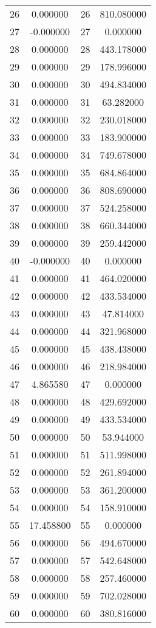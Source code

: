\documentclass[12pt]{article}
\begin{document}
\begin{longtable}{@{}cccc@{}}
26 & 0.000000 & 26 & 810.080000 \\
27 & -0.000000 & 27 & 0.000000 \\
28 & 0.000000 & 28 & 443.178000 \\
29 & 0.000000 & 29 & 178.996000 \\
30 & 0.000000 & 30 & 494.834000 \\
31 & 0.000000 & 31 & 63.282000 \\
32 & 0.000000 & 32 & 230.018000 \\
33 & 0.000000 & 33 & 183.900000 \\
34 & 0.000000 & 34 & 749.678000 \\
35 & 0.000000 & 35 & 684.864000 \\
36 & 0.000000 & 36 & 808.690000 \\
37 & 0.000000 & 37 & 524.258000 \\
38 & 0.000000 & 38 & 660.344000 \\
39 & 0.000000 & 39 & 259.442000 \\
40 & -0.000000 & 40 & 0.000000 \\
41 & 0.000000 & 41 & 464.020000 \\
42 & 0.000000 & 42 & 433.534000 \\
43 & 0.000000 & 43 & 47.814000 \\
44 & 0.000000 & 44 & 321.968000 \\
45 & 0.000000 & 45 & 438.438000 \\
46 & 0.000000 & 46 & 218.984000 \\
47 & 4.865580 & 47 & 0.000000 \\
48 & 0.000000 & 48 & 429.692000 \\
49 & 0.000000 & 49 & 433.534000 \\
50 & 0.000000 & 50 & 53.944000 \\
51 & 0.000000 & 51 & 511.998000 \\
52 & 0.000000 & 52 & 261.894000 \\
53 & 0.000000 & 53 & 361.200000 \\
54 & 0.000000 & 54 & 158.910000 \\
55 & 17.458800 & 55 & 0.000000 \\
56 & 0.000000 & 56 & 494.670000 \\
57 & 0.000000 & 57 & 542.648000 \\
58 & 0.000000 & 58 & 257.460000 \\
59 & 0.000000 & 59 & 702.028000 \\
60 & 0.000000 & 60 & 380.816000 \\

\end{longtable}
\end{document}
